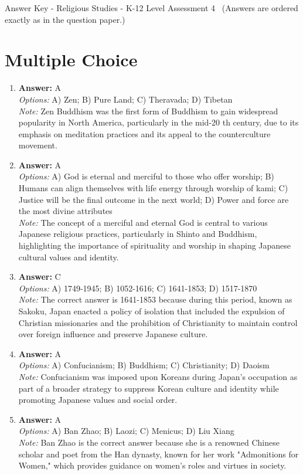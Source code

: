 \documentclass[12pt]{article}
\begin{document}
\begin{center}
Answer Key - Religious Studies - K-12 Level Assessment 4 \
\small (Answers are ordered exactly as in the question paper.)
\end{center}

\section*{Multiple Choice}
\begin{enumerate}[label=\arabic*.]
\item \textbf{Answer:} A
\\ \textit{Options:} A) Zen; B) Pure Land; C) Theravada; D) Tibetan
\\ \textit{Note:} Zen Buddhism was the first form of Buddhism to gain widespread popularity in North America, particularly in the mid-20 th century, due to its emphasis on meditation practices and its appeal to the counterculture movement.
\item \textbf{Answer:} A
\\ \textit{Options:} A) God is eternal and merciful to those who offer worship; B) Humans can align themselves with life energy through worship of kami; C) Justice will be the final outcome in the next world; D) Power and force are the most divine attributes
\\ \textit{Note:} The concept of a merciful and eternal God is central to various Japanese religious practices, particularly in Shinto and Buddhism, highlighting the importance of spirituality and worship in shaping Japanese cultural values and identity.
\item \textbf{Answer:} C
\\ \textit{Options:} A) 1749-1945; B) 1052-1616; C) 1641-1853; D) 1517-1870
\\ \textit{Note:} The correct answer is 1641-1853 because during this period, known as Sakoku, Japan enacted a policy of isolation that included the expulsion of Christian missionaries and the prohibition of Christianity to maintain control over foreign influence and preserve Japanese culture.
\item \textbf{Answer:} A
\\ \textit{Options:} A) Confucianism; B) Buddhism; C) Christianity; D) Daoism
\\ \textit{Note:} Confucianism was imposed upon Koreans during Japan's occupation as part of a broader strategy to suppress Korean culture and identity while promoting Japanese values and social order.
\item \textbf{Answer:} A
\\ \textit{Options:} A) Ban Zhao; B) Laozi; C) Menicus; D) Liu Xiang
\\ \textit{Note:} Ban Zhao is the correct answer because she is a renowned Chinese scholar and poet from the Han dynasty, known for her work "Admonitions for Women," which provides guidance on women's roles and virtues in society.
\end{enumerate}
\end{document}
